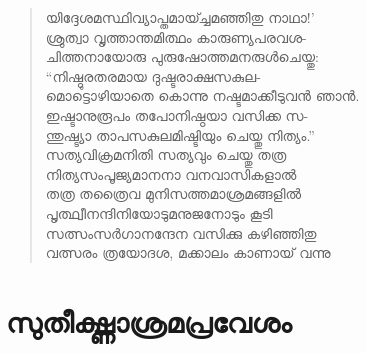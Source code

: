 \begin{verse}
യിദ്ദേശമസ്ഥിവ്യാപ്തമായ്ച്ചമഞ്ഞിതു നാഥാ!’\\
ശ്രുത്വാ വൃത്താന്തമിത്ഥം കാരുണ്യപരവശ-\\
ചിത്തനായോരു പുരുഷോത്തമനരുള്‍ചെയ്തു:\\
“നിഷ്ഠുരതരമായ ദുഷ്ടരാക്ഷസകുല-\\
മൊട്ടൊഴിയാതെ കൊന്നു നഷ്ടമാക്കീടുവന്‍ ഞാന്‍.\\
ഇഷ്ടാനുരൂപം തപോനിഷ്ഠയാ വസിക്ക സ-\\
ന്തുഷ്ട്യാ താപസകുലമിഷ്ടിയും ചെയ്തു നിത്യം.”\\
സത്യവിക്രമനിതി സത്യവും ചെയ്തു തത്ര\\
നിത്യസംപൂജ്യമാനനാ വനവാസികളാല്‍\\
തത്ര തത്രൈവ മുനിസത്തമാശ്രമങ്ങളില്‍\\
പൃത്ഥ്വീനന്ദിനിയോടുമനുജനോടും കൂടി\\
സത്സംസര്‍ഗാനന്ദേന വസിക്കു കഴിഞ്ഞിതു\\
വത്സരം ത്രയോദശ, മക്കാലം കാണായ് വന്നു
\end{verse}

\section{സുതീക്ഷ്ണാശ്രമപ്രവേശം}

